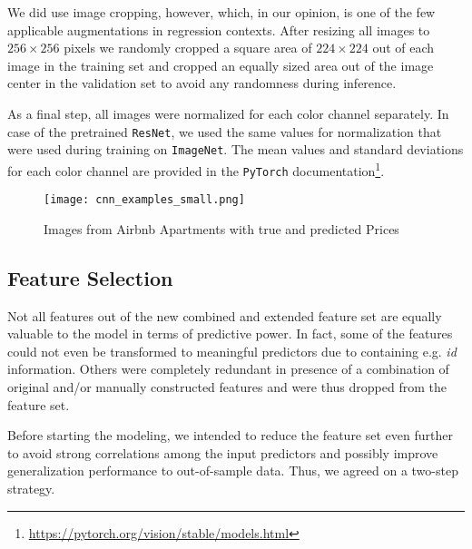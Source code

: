 We did use image cropping, however, which, in our opinion, is one of the few applicable augmentations in regression contexts.
After resizing all images to $256 \times 256$ pixels we randomly cropped a square area of $224 \times 224$ out of each image in the training set and cropped an equally sized area out of the image center in the validation set to avoid any randomness during inference.

As a final step, all images were normalized for each color channel separately.
In case of the pretrained \texttt{ResNet}, we used the same values for normalization that were used during training on \texttt{ImageNet}.
The mean values and standard deviations for each color channel are provided in the \texttt{PyTorch} documentation\footnote{\url{https://pytorch.org/vision/stable/models.html}}.

\begin{figure}[t]
  \centering
  \texttt{[image: cnn\_examples\_small.png]}
  \caption{Images from Airbnb Apartments with true and predicted Prices}
  \label{fig:cnn-examples}
\end{figure}

\subsection{Feature Selection} \label{appendix:feature-selection}

Not all features out of the new combined and extended feature set are equally valuable to the model in terms of predictive power.
In fact, some of the features could not even be transformed to meaningful predictors due to containing e.g. \emph{id} information.
Others were completely redundant in presence of a combination of original and/or manually constructed features and were thus dropped from the feature set.

Before starting the modeling, we intended to reduce the feature set even further to avoid strong correlations among the input predictors and possibly improve generalization performance to out-of-sample data.
Thus, we agreed on a two-step strategy.

